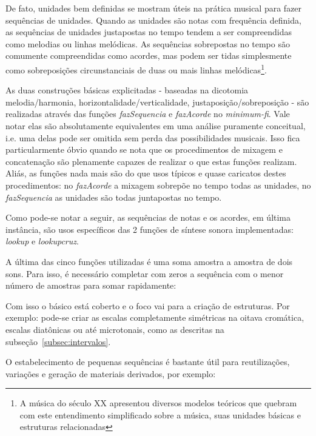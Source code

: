 De fato, unidades bem definidas se mostram úteis na prática musical 
para fazer sequências de unidades. Quando as unidades
são notas com frequência definida, as sequências de unidades justapostas no tempo tendem a ser compreendidas como melodias ou linhas melódicas. As
sequências sobrepostas no tempo são comumente compreendidas como acordes, mas podem ser tidas simplesmente
como sobreposições circunstanciais de duas ou mais linhas melódicas\footnote{A música do século XX apresentou diversos modelos teóricos que quebram com este entendimento simplificado sobre a música, suas unidades básicas e estruturas relacionadas}.\cite{Lacerda}

As duas construções básicas explicitadas - baseadas na dicotomia melodia/harmonia, horizontalidade/verticalidade, justaposição/sobreposição - são realizadas através
das funções \emph{fazSequencia} e \emph{fazAcorde} no \emph{minimum-fi}. Vale notar elas são absolutamente 
equivalentes em uma análise puramente conceitual, i.e. uma delas pode ser omitida sem perda das possibilidades musicais. Isso fica particularmente óbvio quando se nota que os procedimentos de mixagem e concatenação são
plenamente capazes de realizar o que estas funções realizam. Aliás, as funções nada
mais são do que usos típicos e quase caricatos destes procedimentos: no \emph{fazAcorde} a mixagem
sobrepõe no tempo todas as unidades, no \emph{fazSequencia} as unidades são todas juntapostas no tempo.

Como pode-se notar a seguir, as sequências de notas e os acordes, em última instância, são usos específicos das 2 funções de síntese sonora implementadas: \emph{lookup} e \emph{lookupcruz}.



A última das cinco funções utilizadas é uma soma amostra a amostra de dois sons. Para isso,
é necessário completar com zeros a sequência com o menor número de amostras para somar rapidamente:


Com isso o básico está coberto e o foco vai para a criação de estruturas. Por exemplo: 
pode-se criar as
escalas completamente simétricas na oitava cromática, escalas diatônicas ou até microtonais, como as descritas na subseção~\ref{subsec:intervalos}.

O estabelecimento de pequenas sequências é bastante útil para
reutilizações, variações e geração de materiais derivados, por exemplo: 


